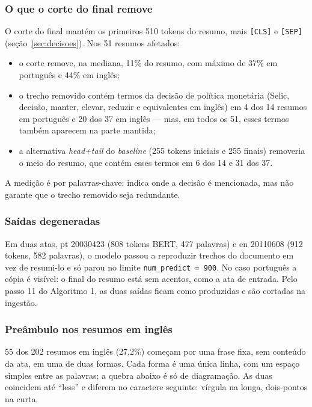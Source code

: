 \documentclass[12pt]{article}
\begin{document}
\subsubsection{O que o corte do final remove}\label{sec:corte}

O corte do final mantém os primeiros 510 tokens do resumo, mais \texttt{[CLS]}
e \texttt{[SEP]} (seção~\ref{sec:decisoes}). Nos 51 resumos afetados:

\begin{itemize}
\item o corte remove, na mediana, 11\% do resumo, com máximo de 37\% em
  português e 44\% em inglês;
\item o trecho removido contém termos da decisão de política monetária (Selic,
  decisão, manter, elevar, reduzir e equivalentes em inglês) em 4 dos 14
  resumos em português e 20 dos 37 em inglês --- mas, em todos os 51, esses
  termos também aparecem na parte mantida;
\item a alternativa \textit{head+tail} do \textit{baseline} (255 tokens
  iniciais e 255 finais) removeria o meio do resumo, que contém esses termos em
  6 dos 14 e 31 dos 37.
\end{itemize}

A medição é por palavras-chave: indica onde a decisão é mencionada, mas não
garante que o trecho removido seja redundante.

\subsubsection{Saídas degeneradas}\label{sec:degeneradas}

Em duas atas, pt 20030423 (808 tokens BERT, 477 palavras) e en 20110608 (912
tokens, 582 palavras), o modelo passou a reproduzir trechos do documento em vez
de resumi-lo e só parou no limite \texttt{num\_predict = 900}. No caso
português a cópia é visível: o final do resumo está sem acentos, como a ata de
entrada. Pelo passo 11 do Algoritmo 1, as duas saídas ficam como produzidas e
são cortadas na ingestão.

\subsubsection{Preâmbulo nos resumos em inglês}\label{sec:preambulo}

55 dos 202 resumos em inglês (27,2\%) começam por uma frase fixa, sem conteúdo
da ata, em uma de duas formas. Cada forma é uma única linha, com um espaço
simples entre as palavras; a quebra abaixo é só de diagramação. As duas
coincidem até ``less'' e diferem no caractere seguinte: vírgula na longa,
dois-pontos na curta.
\end{document}
